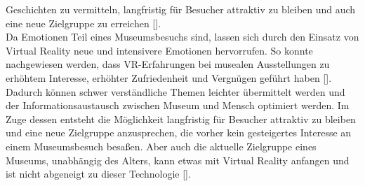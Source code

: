 \documentclass[a4paper,12pt,oneside]{article}
\begin{document}
        Geschichten zu vermitteln, langfristig für Besucher attraktiv zu bleiben und
        auch eine neue Zielgruppe zu erreichen [\cite[34-35]{Heidsiek2019}]. \\
        Da Emotionen Teil eines Museumsbesuchs sind, lassen sich durch den Einsatz
        von Virtual Reality neue und intensivere Emotionen hervorrufen.
        So konnte nachgewiesen werden, dass VR-Erfahrungen
        bei musealen Ausstellungen zu erhöhtem Interesse, erhöhter Zufriedenheit und 
        Vergnügen geführt haben [\cite[69-72]{Heidsiek2019}]. Dadurch können schwer
        verständliche Themen leichter übermittelt werden und der Informationsaustausch
        zwischen Museum und Mensch optimiert werden. 
        Im Zuge dessen entsteht die Möglichkeit langfristig für Besucher 
        attraktiv zu bleiben und eine neue Zielgruppe anzusprechen,
        die vorher kein gesteigertes Interesse an einem Museumsbesuch besaßen.
        Aber auch die aktuelle Zielgruppe eines Museums, unabhängig des Alters, kann
        etwas mit Virtual Reality anfangen und ist nicht abgeneigt zu dieser Technologie [\cite[75]{Heidsiek2019}].
\end{document}
